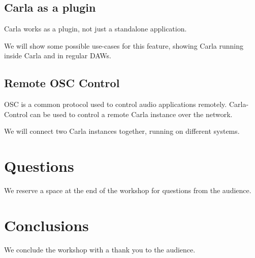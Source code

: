 \documentclass[11pt,a4paper]{article}
\begin{document}
\subsection{Carla as a plugin}

Carla works as a plugin, not just a standalone application.

We will show some possible use-cases for this feature, showing Carla running inside Carla and in regular DAWs.

\subsection{Remote OSC Control}

OSC is a common protocol used to control audio applications remotely.
Carla-Control can be used to control a remote Carla instance over the network.

We will connect two Carla instances together, running on different systems.

\section{Questions}

We reserve a space at the end of the workshop for questions from the audience.

\section{Conclusions}

We conclude the workshop with a thank you to the audience.
\end{document}
